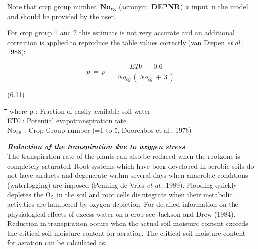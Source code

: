 \documentclass[11pt]{article}
\begin{document}
 \bigskip
Note that crop group number, {\bf No$_{{\rm cg}}$} (acronym: {\bf DEPNR}) is input in the model and should
be provided by the user.

\bigskip
\bigskip
For crop group 1 and 2 this estimate is not very accurate and an additional correction is
applied to reproduce the table values correctly (van Diepen {\it et al\/}., 1988):

\begin{displaymath}
p~=~p~+~{\frac{ET0 ~-~ 0.6}{No _{cg} \, (\, No _{cg} ~+~3\, )}}
\end{displaymath}

 \bigskip
\strut\hfill (6.11)

\nwln
\begin{tabbing}
\hspace{1.27cm}\=\hspace{1.27cm}\=\hspace{1.27cm}\=\hspace{1.27cm}\=%
\hspace{1.27cm}\=\hspace{1.27cm}\=\hspace{1.27cm}\=\hspace{1.27cm}\=%
\hspace{1.27cm}\=\hspace{1.27cm}\=\kill
where\> p\> : Fraction of easily available soil water\> \> \> \> \> \> \> \> [cm$^{{\rm 3}}$ cm$^{{\rm -3}}$]\\
\>ET0\> : Potential evapotranspiration rate\> \> \> \> \> \> \> \> [cm d$^{{\rm -1}}$]\\
\>No$_{{\rm cg}}$\> : Crop Group number {\small (=1 to 5, Doorenbos et al., 1978)}\> \> \> \> \> \> \> \> [-]
\end{tabbing}

\bigskip
\bigskip
{\bf {\it Reduction of the transpiration due to oxygen stress\/}}\\
The transpiration rate of the plants can also be reduced when the rootzone is completely
saturated. Root systems which have been developed in aerobic soils do not have airducts
and degenerate within several days when anaerobic conditions (waterlogging) are imposed
(Penning de Vries {\it et al\/}., 1989). Flooding quickly depletes the O$_{{\rm 2}}$ in the soil and root cells
disintegrate when their metabolic activities are hampered by oxygen depletion. For
detailed information on the physiological effects of excess water on a crop see Jackson
and Drew (1984).\\
Reduction in transpiration occurs when the actual soil moisture content exceeds the
critical soil moisture content for aeration. The critical soil moisture content for aeration
can be calculated as:
\end{document}
